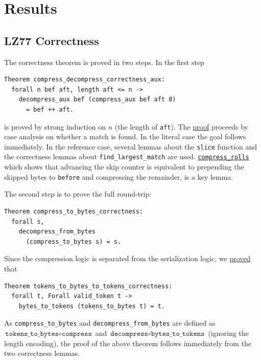 \documentclass[
  a4paper, twocolumn, DIV=calc]{scrartcl}
\begin{document}
\section{Results}

\subsection{LZ77 Correctness}

The correctness theorem is proved in two steps. In the first step
\begin{verbatim}
Theorem compress_decompress_correctness_aux:
  forall n bef aft, length aft <= n ->
    decompress_aux bef (compress_aux bef aft 0)
      = bef ++ aft.
\end{verbatim}
is proved by strong induction on $n$ (the length of \texttt{aft}).
The \href{https://github.com/Jatana/LZ78FormalVerification/blob/2819b54b6eb88639461c4fd3504fbc2a87e8cbc0/lz77/LZ.v#L95}{proof}
proceeds by case analysis on whether a match is found. In the literal
case the goal follows immediately. In the reference case, several lemmas about
the \texttt{slice} function and the correctness lemmas about
\texttt{find\_largest\_match} are used.
\href{https://github.com/Jatana/LZ78FormalVerification/blob/2819b54b6eb88639461c4fd3504fbc2a87e8cbc0/lz77/LZ.v#L58}{\texttt{compress\_rolls}}
which shows that advancing the skip counter is equivalent to prepending the
skipped bytes to \texttt{before} and compressing the remainder, is a key lemma.

The second step is to prove the full round-trip:
\begin{verbatim}
Theorem compress_to_bytes_correctness:
  forall s,
    decompress_from_bytes
      (compress_to_bytes s) = s.
\end{verbatim}
Since the compression logic is separated from the serialization logic, we
\href{https://github.com/Jatana/LZ78FormalVerification/blob/2819b54b6eb88639461c4fd3504fbc2a87e8cbc0/lz77/LZ_Tokens.v#L683}{proved} that
\begin{verbatim}
Theorem tokens_to_bytes_to_tokens_correctness:
  forall t, Forall valid_token t ->
    bytes_to_tokens (tokens_to_bytes t) = t.
\end{verbatim}
As \texttt{compress\_to\_bytes} and \texttt{decompress\_from\_bytes} are defined
as $\texttt{tokens\_to\_bytes} \circ \texttt{compress}$  and
$\texttt{decompress} \circ \texttt{bytes\_to\_tokens}$ (ignoring the length
encoding), the proof of the above theorem follows immediately from the two
correctness lemmas.
\end{document}
